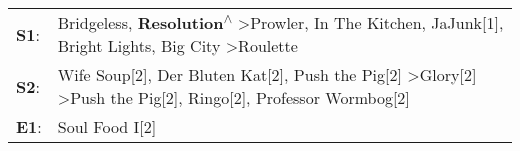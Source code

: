 \begin{supertabular}{p{0.03\textwidth}p{0.92\textwidth}}
 \textbf{S1}:  &  Bridgeless\textsuperscript{}, \enspace \textbf{Resolution\textsuperscript{$\wedge$}} \textgreater \enspace Prowler\textsuperscript{}, \enspace In The Kitchen\textsuperscript{}, \enspace JaJunk[1]\textsuperscript{}, \enspace Bright Lights, Big City\textsuperscript{} \textgreater \enspace Roulette\textsuperscript{}  \enspace  \\
 \textbf{S2}:  &     Wife Soup[2]\textsuperscript{}, \enspace Der Bluten Kat[2]\textsuperscript{}, \enspace Push the Pig[2]\textsuperscript{} \textgreater \enspace Glory[2]\textsuperscript{} \textgreater \enspace Push the Pig[2]\textsuperscript{}, \enspace Ringo[2]\textsuperscript{}, \enspace Professor Wormbog[2]\textsuperscript{}  \enspace  \\
 \textbf{E1}:  &                                                                                                                                                                                                                                                                                            Soul Food I[2]\textsuperscript{}  \enspace  \\
\end{supertabular}
